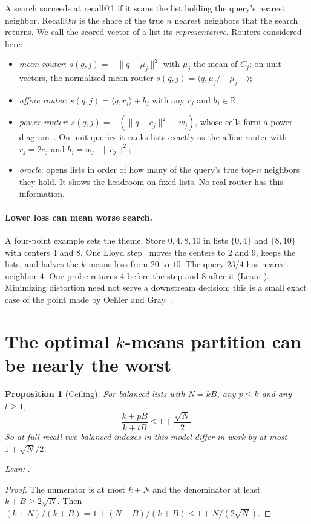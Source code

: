 \documentclass[11pt]{article}
\newtheorem{proposition}[theorem]{Proposition}
\theoremstyle{definition}
\theoremstyle{remark}
\newcommand{\R}{\mathbb{R}}
\newcommand{\leanline}[1]{{\sloppy\noindent\small\textit{Lean:} #1.\par}\smallskip}
\begin{document}
A search succeeds at recall@1 if it scans the list holding the query's nearest neighbor. Recall@$n$ is the share of the true $n$ nearest neighbors that the search returns. We call the scored vector of a list its \emph{representative}. Routers considered here:
\begin{itemize}
\item \emph{mean router}: $s(q,j) = -\|q-\mu_j\|^2$ with $\mu_j$ the mean of $C_j$; on unit vectors, the normalized-mean router $s(q,j)=\langle q,\mu_j/\|\mu_j\|\rangle$;
\item \emph{affine router}: $s(q,j)=\langle q,r_j\rangle + b_j$ with any $r_j$ and $b_j\in\R$;
\item \emph{power router}: $s(q,j) = -(\|q-c_j\|^2 - w_j)$, whose cells form a power diagram~\cite{aurenhammer1987}. On unit queries it ranks lists exactly as the affine router with $r_j=2c_j$ and $b_j = w_j-\|c_j\|^2$;
\item \emph{oracle}: opens lists in order of how many of the query's true top-$n$ neighbors they hold. It shows the headroom on fixed lists. No real router has this information.
\end{itemize}

\paragraph{Lower loss can mean worse search.} A four-point example sets the theme. Store $0,4,8,10$ in lists $\{0,4\}$ and $\{8,10\}$ with centers $4$ and $8$. One Lloyd step~\cite{lloyd1982} moves the centers to $2$ and $9$, keeps the lists, and halves the $k$-means loss from $20$ to $10$. The query $23/4$ has nearest neighbor $4$. One probe returns $4$ before the step and $8$ after it (Lean: ). Minimizing distortion need not serve a downstream decision; this is a small exact case of the point made by Oehler and Gray~\cite{oehler1995}.

\section{The optimal $k$-means partition can be nearly the worst}\label{sec:planar}

\begin{proposition}[Ceiling]\label{prop:ceiling}
For balanced lists with $N=kB$, any $p\le k$ and any $t\ge1$,
\[
\frac{k+pB}{k+tB} \le 1+\frac{\sqrt N}{2}.
\]
So at full recall two balanced indexes in this model differ in work by at most $1+\sqrt N/2$.
\end{proposition}
\leanline{}
\begin{proof}
The numerator is at most $k+N$ and the denominator at least $k+B\ge 2\sqrt N$. Then $(k+N)/(k+B) = 1 + (N-B)/(k+B) \le 1+N/(2\sqrt N)$.
\end{proof}
\end{document}
